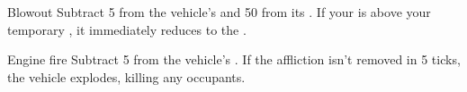 
\begin{describe}{Blowout}
  Subtract 5 from the vehicle's  and 50 from its . If your  is above your temporary , it immediately reduces to the .
\end{describe}

\begin{describe}{Engine fire}
  Subtract 5 from the vehicle's . If the affliction isn't removed in 5 ticks, the vehicle explodes, killing any occupants.
\end{describe}
